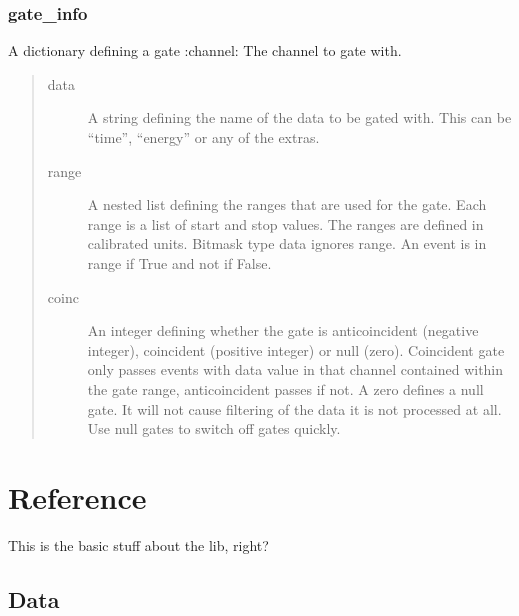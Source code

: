\documentclass[letterpaper,10pt,english]{sphinxmanual}
\begin{document}
\subsection{gate\_info}
\label{\detokenize{manual/configuration:gate-info}}
\sphinxAtStartPar
A dictionary defining a gate
:channel:       The channel to gate with.
\begin{quote}\begin{description}
\item[{data}] \leavevmode
\sphinxAtStartPar
A string defining the name of the data to be gated with. This can be “time”, “energy” or any of the extras.

\item[{range}] \leavevmode
\sphinxAtStartPar
A nested list defining the ranges that are used for the gate. Each range is a list of start and stop values.
The ranges are defined in calibrated units. Bitmask type data ignores range. An event is in range if
True and not if False.

\item[{coinc}] \leavevmode
\sphinxAtStartPar
An integer defining whether the gate is anticoincident (negative integer), coincident (positive
integer) or null (zero). Coincident gate only passes events with data value in that channel contained
within the gate range, anticoincident passes if not. A zero defines a null gate. It will not cause
filtering of the data \sphinxhyphen{} it is not processed at all. Use null gates to switch off gates quickly.

\end{description}\end{quote}


\chapter{Reference}
\label{\detokenize{autodocs/reference:reference}}\label{\detokenize{autodocs/reference::doc}}
\sphinxAtStartPar
This is the basic stuff about the lib, right?


\section{Data}
\label{\detokenize{autodocs/data:module-listmode.data}}\label{\detokenize{autodocs/data:data}}\label{\detokenize{autodocs/data::doc}}
\end{document}
